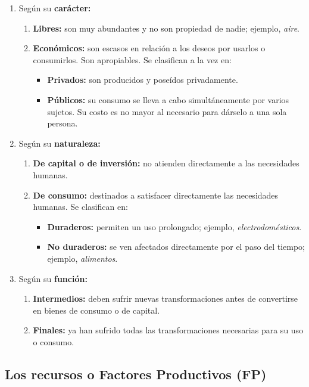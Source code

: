\documentclass[10pt,a4paper]{article}
\begin{document}
\begin{enumerate}
\item Según su \textbf{carácter:}
\begin{enumerate}
\item \textbf{Libres:} son muy abundantes y no son propiedad de nadie; ejemplo, \textit{aire}.
\item \textbf{Económicos:} son escasos en relación a los deseos por usarlos o consumirlos. Son apropiables. Se clasifican a la vez en:
\begin{itemize}
\item \textbf{Privados:} son producidos y poseídos privadamente.
\item \textbf{Públicos:} su consumo se lleva a cabo simultáneamente por varios sujetos. Su costo es no mayor al necesario para dárselo a una sola persona.
\end{itemize}
\end{enumerate}
\item Según su \textbf{naturaleza:}
\begin{enumerate}
\item \textbf{De capital o de inversión:} no atienden directamente a las necesidades humanas.
\item \textbf{De consumo:} destinados a satisfacer directamente las necesidades humanas. Se clasifican en:
\begin{itemize}
\item \textbf{Duraderos:} permiten un uso prolongado; ejemplo, \textit{electrodomésticos}.
\item \textbf{No duraderos:} se ven afectados directamente por el paso del tiempo; ejemplo, \textit{alimentos}.
\end{itemize}
\end{enumerate}
\item Según su \textbf{función:}
\begin{enumerate}
\item \textbf{Intermedios:} deben sufrir nuevas transformaciones antes de convertirse en bienes de consumo o de capital.
\item \textbf{Finales:} ya han sufrido todas las transformaciones necesarias para su uso o consumo.
\end{enumerate}
\end{enumerate}

\subsection{Los recursos o Factores Productivos (FP)}
\end{document}
